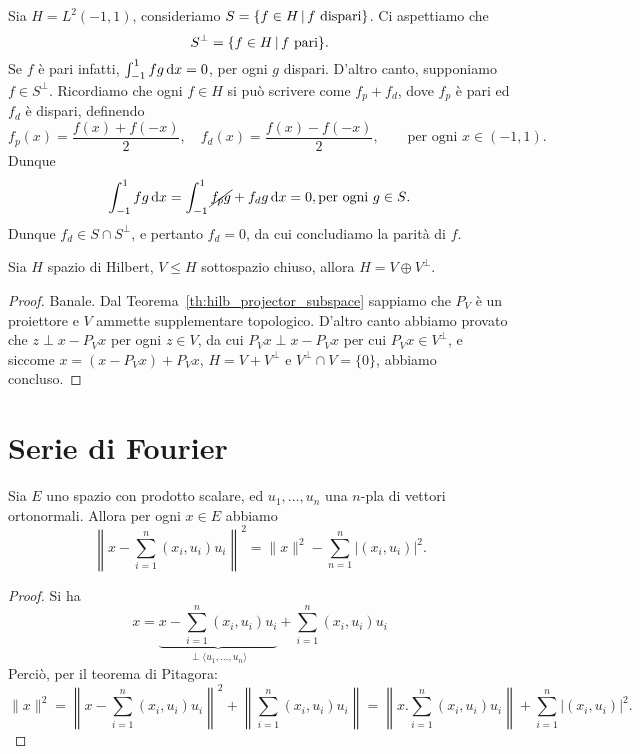 \begin{example}
	Sia $H=L^2(-1,1)$, consideriamo $S=\{f \in H \,|\, \text{$f$ dispari}\}$. Ci aspettiamo che
	\begin{equation*}
		S^\perp = \{f \in H \,|\, \text{$f$ pari}\}.
	\end{equation*}
	Se $f$ è pari infatti, $\int_{-1}^1 fg \,\mathrm{d}x = 0$, per ogni $g$ dispari. D'altro canto, supponiamo $f \in S^\perp$. Ricordiamo che ogni $f \in H$ si può scrivere come $f_p + f_d$, dove $f_p$ è pari ed $f_d$ è dispari, definendo
	\begin{equation*}
		f_p(x) = \frac{f(x) + f(-x)}2, \quad f_d(x) = \frac{f(x) - f(-x)}2, \qquad \text{per ogni $x \in (-1,1)$}.
	\end{equation*}
	Dunque
	\begin{equation*}
		\int_{-1}^1 f g\,\mathrm{d}x = \int_{-1}^1 \cancel{f_pg} + f_dg\,\mathrm{d}x = 0, \text{per ogni $g \in S$}.
	\end{equation*}
	Dunque $f_d \in S \cap S^\perp$, e pertanto $f_d = 0$, da cui concludiamo la parità di $f$.
\end{example}

\begin{theorem}
	Sia $H$ spazio di Hilbert, $V \leq H$ sottospazio chiuso, allora $H = V \oplus V^\perp$.
\end{theorem}
\begin{proof}
	Banale. Dal Teorema~\ref{th:hilb_projector_subspace} sappiamo che $P_V$ è un proiettore e $V$ ammette supplementare topologico. D'altro canto abbiamo provato che $z \perp x-P_V x$ per ogni $z \in V$, da cui $P_V x \perp x - P_V x$ per cui $P_V x \in V^\perp$, e siccome $x = (x-P_V x)+ P_V x$, $H = V + V^\perp$ e $V^\perp \cap V = \{0\}$, abbiamo concluso.
\end{proof}

\section{Serie di Fourier}
\begin{lemma}
	Sia $E$ uno spazio con prodotto scalare, ed $u_1, \ldots, u_n$ una $n$-pla di vettori ortonormali.
	Allora per ogni $x \in E$ abbiamo
	\begin{equation*}
		\left\|x - \sum_{i=1}^n (x_i,u_i)u_i \right\|^2 = \|x\|^2 - \sum_{n=1}^n |(x_i,u_i)|^2.
	\end{equation*}
\end{lemma}
\begin{proof}
	Si ha
	\begin{equation*}
		x = \underbrace{x- \sum_{i=1}^n (x_i, u_i)u_i}_{\perp \langle u_1, \ldots, u_n \rangle} + \sum_{i=1}^n (x_i, u_i)u_i
	\end{equation*}
	Perciò, per il teorema di Pitagora:
	\begin{equation*}
		\|x\|^2 = \left\|x - \sum_{i=1}^n (x_i, u_i)u_i \right\|^2 + \left\| \sum_{i=1}^n (x_i,u_i)u_i\right\| = \left\| x. \sum_{i=1}^n (x_i,u_i)u_i \right\| + \sum_{i=1}^n |(x_i,u_i)|^2.
	\end{equation*}
\end{proof}

